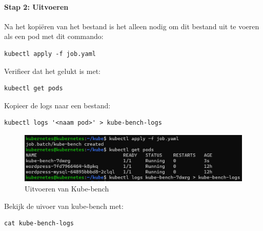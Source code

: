 \paragraph{Stap 2: Uitvoeren}
Na het kopiëren van het bestand is het alleen nodig om dit bestand uit te voeren als een pod met dit commando:
\begin{lstlisting}[language=tex, caption={Job.yaml uitvoeren}]
kubectl apply -f job.yaml
\end{lstlisting}

Verifieer dat het gelukt is met:
\begin{lstlisting}[language=tex, caption={Pods weergeven}]
kubectl get pods
\end{lstlisting}

Kopieer de logs naar een bestand:
\begin{lstlisting}[language=tex, caption={Kopieer de logs naar een bestand}]
kubectl logs '<naam pod>' > kube-bench-logs
\end{lstlisting}

\begin{flushleft}
    \begin{figure}[h]
        \includegraphics[width=.85\textwidth]{graphics/kube-bench-logs.png}
        \caption{\label{fig:KubebenchLogs}Uitvoeren van Kube-bench}
    \end{figure} 
\end{flushleft}

Bekijk de uivoer van kube-bench met:
\begin{lstlisting}[language=tex, caption={Bekijken uitvoer kube-bench}]
cat kube-bench-logs
\end{lstlisting}


